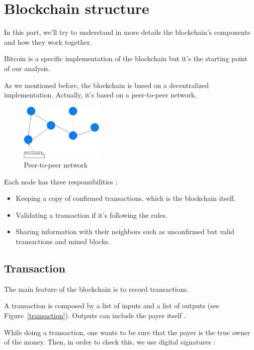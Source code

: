 \section{Blockchain structure}

In this part, we'll try to understand in more details the blockchain's components and how they work together.

Bitcoin is a specific implementation of the blockchain but it's the starting point of our analysis. \newline

As we mentioned before, the blockchain is based on a decentralized implementation. Actually, it's based on a peer-to-peer network.

\begin{figure}[h]
\centering
\includegraphics[width=4cm]{Figures/network}
\caption{Peer-to-peer network}
\end{figure}
\medskip

Each node has three responsibilities :

\begin{itemize}
  \item Keeping a copy of confirmed transactions, which is the blockchain itself.
  \item Validating a transaction if it's following the rules.
  \item Sharing information with their neighbors such as unconfirmed but valid transactions and mined blocks.
\end{itemize}

\clearpage

  \subsection{Transaction}

The main feature of the blockchain is to record transactions.

A transaction is composed by a list of inputs and a list of outputs (see Figure~\ref{transaction}). Outputs can include the payer itself . \newline

While doing a transaction, one wants to be sure that the payer is the true owner of the money. Then, in order to check this,  we use digital signatures :

